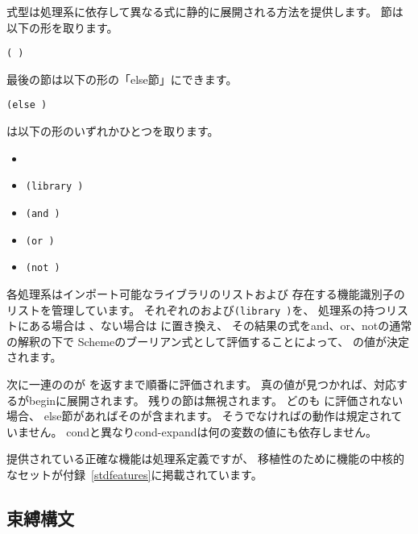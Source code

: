 \begin{entry}{%
}

\syntax
{}式型は処理系に依存して異なる式に静的に展開される方法を提供します。
節は以下の形を取ります。

{\tt(  \dotsfoo)}

最後の節は以下の形の「else節」にできます。

{\tt(else  \dotsfoo)}

は以下の形のいずれかひとつを取ります。

\begin{itemize}
\item {\tt{}}
\item {\tt(library )}
\item {\tt(and  \dotsfoo)}
\item {\tt(or  \dotsfoo)}
\item {\tt(not )}
\end{itemize}

\semantics
各処理系はインポート可能なライブラリのリストおよび
存在する機能識別子のリストを管理しています。
それぞれのおよび{\tt(library )}を、
処理系の持つリストにある場合は \schtrue{}、ない場合は \schfalse{}に置き換え、
その結果の式を{\cf and}、{\cf or}、{\cf not}の通常の解釈の下で
Schemeのブーリアン式として評価することによって、
の値が決定されます。

次に一連ののが %
\schtrue{}を返すまで順番に評価されます。
真の値が見つかれば、対応するが{\cf begin}に展開されます。
残りの節は無視されます。
どのも \schtrue{}に評価されない場合、
else節があればそのが含まれます。
そうでなければの動作は規定されていません。
{\cf cond}と異なり{\cf cond-expand}は何の変数の値にも依存しません。

提供されている正確な機能は処理系定義ですが、
移植性のために機能の中核的なセットが付録~\ref{stdfeatures}に掲載されています。

\end{entry}

\subsection{束縛構文}
\label{bindingsection}

